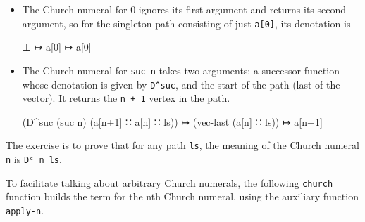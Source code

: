 \begin{itemize}
\item
  The Church numeral for 0 ignores its first argument and returns its
  second argument, so for the singleton path consisting of just
  \texttt{a{[}0{]}}, its denotation is

  \begin{myDisplay}
    ⊥ ↦ a[0] ↦ a[0]
  \end{myDisplay}
\item
  The Church numeral for \texttt{suc\ n} takes two arguments: a
  successor function whose denotation is given by \texttt{D\^{}suc}, and
  the start of the path (last of the vector). It returns the
  \texttt{n\ +\ 1} vertex in the path.

  \begin{myDisplay}
    (D^suc (suc n) (a[n+1] ∷ a[n] ∷ ls)) ↦ (vec-last (a[n] ∷ ls)) ↦ a[n+1]
  \end{myDisplay}
\end{itemize}

The exercise is to prove that for any path \texttt{ls}, the meaning of
the Church numeral \texttt{n} is \texttt{Dᶜ\ n\ ls}.

To facilitate talking about arbitrary Church numerals, the following
\texttt{church} function builds the term for the nth Church numeral,
using the auxiliary function \texttt{apply-n}.


